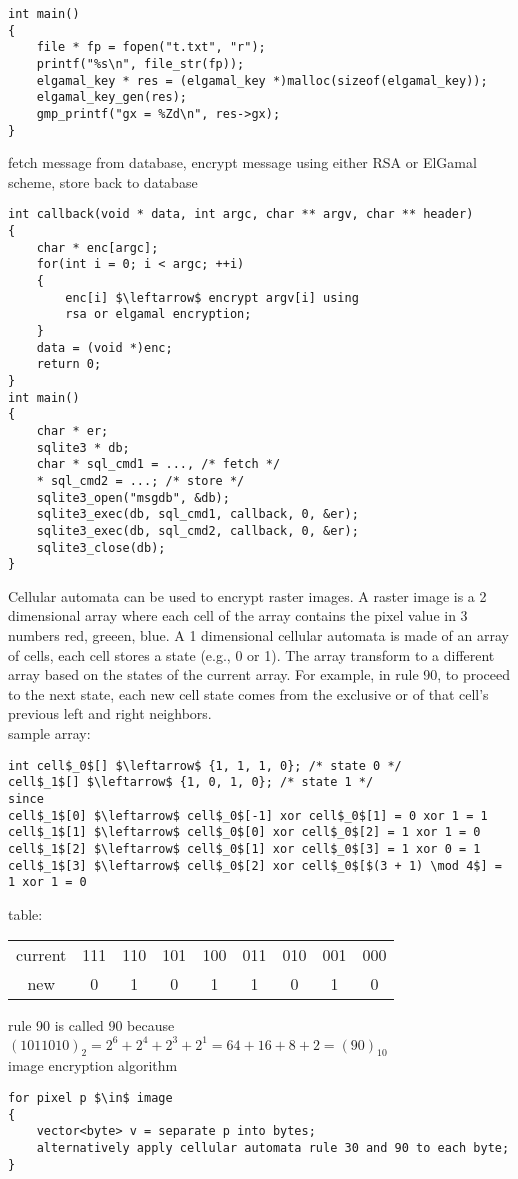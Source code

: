 \documentclass[12pt, border = 4pt, multi]{article} %
\begin{document}
\begin{multicols}{2}
\begin{lstlisting}[morekeywords = {mpz_t, time_t, define, undef}]
int main()
{
	file * fp = fopen("t.txt", "r");
	printf("%s\n", file_str(fp));
	elgamal_key * res = (elgamal_key *)malloc(sizeof(elgamal_key));
	elgamal_key_gen(res);
	gmp_printf("gx = %Zd\n", res->gx);
}
\end{lstlisting}
fetch message from database, encrypt message using either RSA or ElGamal scheme, store back to database
\begin{lstlisting}[mathescape = true]
int callback(void * data, int argc, char ** argv, char ** header)
{
    char * enc[argc];
    for(int i = 0; i < argc; ++i)
    {
    	enc[i] $\leftarrow$ encrypt argv[i] using
    	rsa or elgamal encryption;
    }
    data = (void *)enc;
    return 0;
}
int main()
{
    char * er;
    sqlite3 * db;
    char * sql_cmd1 = ..., /* fetch */
    * sql_cmd2 = ...; /* store */
    sqlite3_open("msgdb", &db);
    sqlite3_exec(db, sql_cmd1, callback, 0, &er);
    sqlite3_exec(db, sql_cmd2, callback, 0, &er);
    sqlite3_close(db);
}
\end{lstlisting}
Cellular automata can be used to encrypt raster images. A raster image is a 2 dimensional array where each cell of the array contains the pixel value in 3 numbers red, greeen, blue. A 1 dimensional cellular automata is made of an array of cells, each cell stores a state (e.g., 0 or 1). The array transform to a different array based on the states of the current array. For example, in rule 90, to proceed to the next state, each new cell state comes from the exclusive or of that cell's previous left and right neighbors.\\
sample array:
\begin{lstlisting}[mathescape = true]
int cell$_0$[] $\leftarrow$ {1, 1, 1, 0}; /* state 0 */
cell$_1$[] $\leftarrow$ {1, 0, 1, 0}; /* state 1 */
since
cell$_1$[0] $\leftarrow$ cell$_0$[-1] xor cell$_0$[1] = 0 xor 1 = 1
cell$_1$[1] $\leftarrow$ cell$_0$[0] xor cell$_0$[2] = 1 xor 1 = 0
cell$_1$[2] $\leftarrow$ cell$_0$[1] xor cell$_0$[3] = 1 xor 0 = 1
cell$_1$[3] $\leftarrow$ cell$_0$[2] xor cell$_0$[$(3 + 1) \mod 4$] = 1 xor 1 = 0
\end{lstlisting}
table:
{\scriptsize
\begin{tabular}{ccccccccc}
current & 111 & 110 & 101 & 100 & 011 & 010 & 001 & 000\\
new & 0 & 1 & 0 & 1 & 1 & 0 & 1 & 0
\end{tabular}
}
rule 90 is called 90 because $(1011010)_2 = 2^6 + 2^4 + 2^3 + 2^1 = 64 + 16 + 8 + 2 = (90)_{10}$\\
image encryption algorithm
\begin{lstlisting}[mathescape = true]
for pixel p $\in$ image
{
    vector<byte> v = separate p into bytes;
    alternatively apply cellular automata rule 30 and 90 to each byte;
}
\end{lstlisting}
\end{multicols}
\end{document}
